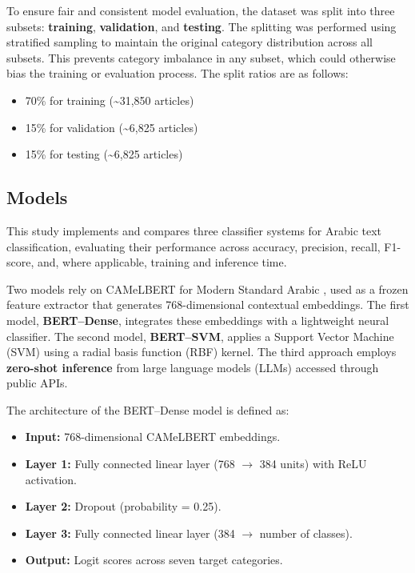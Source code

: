 \documentclass[preprint,12pt,authoryear]{elsarticle}
\begin{document}
To ensure fair and consistent model evaluation, the dataset was split into three subsets: \textbf{training}, \textbf{validation}, and \textbf{testing}. The splitting was performed using stratified sampling to maintain the original category distribution across all subsets. This prevents category imbalance in any subset, which could otherwise bias the training or evaluation process. The split ratios are as follows:
\begin{itemize}
    \item 70\% for training (\textasciitilde31,850 articles)
    \item 15\% for validation (\textasciitilde6,825 articles)
    \item 15\% for testing (\textasciitilde6,825 articles)
\end{itemize}

\subsection{Models}

This study implements and compares three classifier systems for Arabic text classification, evaluating their performance across accuracy, precision, recall, F1-score, and, where applicable, training and inference time.

Two models rely on CAMeLBERT for Modern Standard Arabic \cite{DBLP:journals/corr/abs-2103-06678}, used as a frozen feature extractor that generates 768-dimensional contextual embeddings. The first model, \textbf{BERT–Dense}, integrates these embeddings with a lightweight neural classifier. The second model, \textbf{BERT–SVM}, applies a Support Vector Machine (SVM) using a radial basis function (RBF) kernel. The third approach employs \textbf{zero-shot inference} from large language models (LLMs) accessed through public APIs.

\noindent The architecture of the BERT–Dense model is defined as:
\begin{itemize}
    \item \textbf{Input:} 768-dimensional CAMeLBERT embeddings.
    \item \textbf{Layer 1:} Fully connected linear layer (768 $\rightarrow$ 384 units) with ReLU activation.
    \item \textbf{Layer 2:} Dropout (probability = 0.25).
    \item \textbf{Layer 3:} Fully connected linear layer (384 $\rightarrow$ number of classes).
    \item \textbf{Output:} Logit scores across seven target categories.
\end{itemize}
\end{document}
